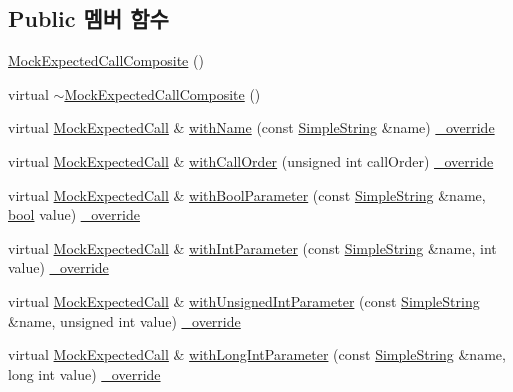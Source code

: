 \subsection*{Public 멤버 함수}
\begin{DoxyCompactItemize}
\item 
\hyperlink{class_mock_expected_call_composite_a7da16c9a025fa6e73fa2d2602325d5d1}{Mock\+Expected\+Call\+Composite} ()
\item 
virtual \hyperlink{class_mock_expected_call_composite_a585f660f2bc2fb628478cc58043f7679}{$\sim$\+Mock\+Expected\+Call\+Composite} ()
\item 
virtual \hyperlink{class_mock_expected_call}{Mock\+Expected\+Call} \& \hyperlink{class_mock_expected_call_composite_a956e88393edbb7f7427eecb56ac5e317}{with\+Name} (const \hyperlink{class_simple_string}{Simple\+String} \&name) \hyperlink{_cpp_u_test_config_8h_a049bea15dd750e15869863c94c1efc3b}{\+\_\+override}
\item 
virtual \hyperlink{class_mock_expected_call}{Mock\+Expected\+Call} \& \hyperlink{class_mock_expected_call_composite_a4406dd9a38b0a29197dcde6a4c5c2289}{with\+Call\+Order} (unsigned int call\+Order) \hyperlink{_cpp_u_test_config_8h_a049bea15dd750e15869863c94c1efc3b}{\+\_\+override}
\item 
virtual \hyperlink{class_mock_expected_call}{Mock\+Expected\+Call} \& \hyperlink{class_mock_expected_call_composite_a49e02522fe64e0e974cb7d91648e39c3}{with\+Bool\+Parameter} (const \hyperlink{class_simple_string}{Simple\+String} \&name, \hyperlink{avb__gptp_8h_af6a258d8f3ee5206d682d799316314b1}{bool} value) \hyperlink{_cpp_u_test_config_8h_a049bea15dd750e15869863c94c1efc3b}{\+\_\+override}
\item 
virtual \hyperlink{class_mock_expected_call}{Mock\+Expected\+Call} \& \hyperlink{class_mock_expected_call_composite_a1a63a585050f40a7e76421bcaf30e689}{with\+Int\+Parameter} (const \hyperlink{class_simple_string}{Simple\+String} \&name, int value) \hyperlink{_cpp_u_test_config_8h_a049bea15dd750e15869863c94c1efc3b}{\+\_\+override}
\item 
virtual \hyperlink{class_mock_expected_call}{Mock\+Expected\+Call} \& \hyperlink{class_mock_expected_call_composite_a288909ec68852675078e0c46afcc53fe}{with\+Unsigned\+Int\+Parameter} (const \hyperlink{class_simple_string}{Simple\+String} \&name, unsigned int value) \hyperlink{_cpp_u_test_config_8h_a049bea15dd750e15869863c94c1efc3b}{\+\_\+override}
\item 
virtual \hyperlink{class_mock_expected_call}{Mock\+Expected\+Call} \& \hyperlink{class_mock_expected_call_composite_aee54849bed7bd0d7e9466ad9f70d56e3}{with\+Long\+Int\+Parameter} (const \hyperlink{class_simple_string}{Simple\+String} \&name, long int value) \hyperlink{_cpp_u_test_config_8h_a049bea15dd750e15869863c94c1efc3b}{\+\_\+override}

\end{DoxyCompactItemize}
